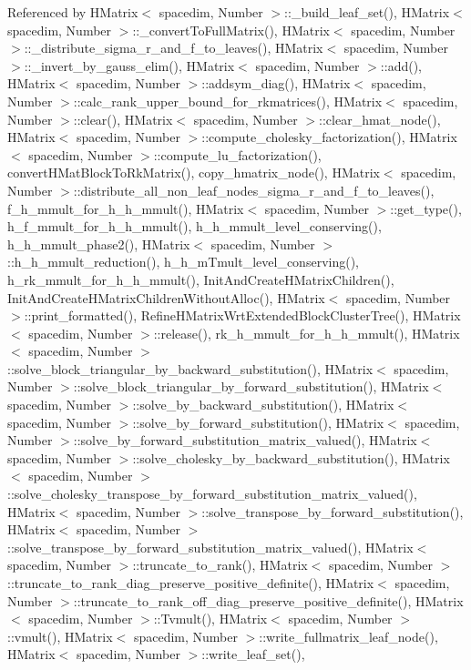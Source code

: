 Referenced by H\+Matrix$<$ spacedim, Number $>$\+::\+\_\+build\+\_\+leaf\+\_\+set(), H\+Matrix$<$ spacedim, Number $>$\+::\+\_\+convert\+To\+Full\+Matrix(), H\+Matrix$<$ spacedim, Number $>$\+::\+\_\+distribute\+\_\+sigma\+\_\+r\+\_\+and\+\_\+f\+\_\+to\+\_\+leaves(), H\+Matrix$<$ spacedim, Number $>$\+::\+\_\+invert\+\_\+by\+\_\+gauss\+\_\+elim(), H\+Matrix$<$ spacedim, Number $>$\+::add(), H\+Matrix$<$ spacedim, Number $>$\+::addsym\+\_\+diag(), H\+Matrix$<$ spacedim, Number $>$\+::calc\+\_\+rank\+\_\+upper\+\_\+bound\+\_\+for\+\_\+rkmatrices(), H\+Matrix$<$ spacedim, Number $>$\+::clear(), H\+Matrix$<$ spacedim, Number $>$\+::clear\+\_\+hmat\+\_\+node(), H\+Matrix$<$ spacedim, Number $>$\+::compute\+\_\+cholesky\+\_\+factorization(), H\+Matrix$<$ spacedim, Number $>$\+::compute\+\_\+lu\+\_\+factorization(), convert\+H\+Mat\+Block\+To\+Rk\+Matrix(), copy\+\_\+hmatrix\+\_\+node(), H\+Matrix$<$ spacedim, Number $>$\+::distribute\+\_\+all\+\_\+non\+\_\+leaf\+\_\+nodes\+\_\+sigma\+\_\+r\+\_\+and\+\_\+f\+\_\+to\+\_\+leaves(), f\+\_\+h\+\_\+mmult\+\_\+for\+\_\+h\+\_\+h\+\_\+mmult(), H\+Matrix$<$ spacedim, Number $>$\+::get\+\_\+type(), h\+\_\+f\+\_\+mmult\+\_\+for\+\_\+h\+\_\+h\+\_\+mmult(), h\+\_\+h\+\_\+mmult\+\_\+level\+\_\+conserving(), h\+\_\+h\+\_\+mmult\+\_\+phase2(), H\+Matrix$<$ spacedim, Number $>$\+::h\+\_\+h\+\_\+mmult\+\_\+reduction(), h\+\_\+h\+\_\+m\+Tmult\+\_\+level\+\_\+conserving(), h\+\_\+rk\+\_\+mmult\+\_\+for\+\_\+h\+\_\+h\+\_\+mmult(), Init\+And\+Create\+H\+Matrix\+Children(), Init\+And\+Create\+H\+Matrix\+Children\+Without\+Alloc(), H\+Matrix$<$ spacedim, Number $>$\+::print\+\_\+formatted(), Refine\+H\+Matrix\+Wrt\+Extended\+Block\+Cluster\+Tree(), H\+Matrix$<$ spacedim, Number $>$\+::release(), rk\+\_\+h\+\_\+mmult\+\_\+for\+\_\+h\+\_\+h\+\_\+mmult(), H\+Matrix$<$ spacedim, Number $>$\+::solve\+\_\+block\+\_\+triangular\+\_\+by\+\_\+backward\+\_\+substitution(), H\+Matrix$<$ spacedim, Number $>$\+::solve\+\_\+block\+\_\+triangular\+\_\+by\+\_\+forward\+\_\+substitution(), H\+Matrix$<$ spacedim, Number $>$\+::solve\+\_\+by\+\_\+backward\+\_\+substitution(), H\+Matrix$<$ spacedim, Number $>$\+::solve\+\_\+by\+\_\+forward\+\_\+substitution(), H\+Matrix$<$ spacedim, Number $>$\+::solve\+\_\+by\+\_\+forward\+\_\+substitution\+\_\+matrix\+\_\+valued(), H\+Matrix$<$ spacedim, Number $>$\+::solve\+\_\+cholesky\+\_\+by\+\_\+backward\+\_\+substitution(), H\+Matrix$<$ spacedim, Number $>$\+::solve\+\_\+cholesky\+\_\+transpose\+\_\+by\+\_\+forward\+\_\+substitution\+\_\+matrix\+\_\+valued(), H\+Matrix$<$ spacedim, Number $>$\+::solve\+\_\+transpose\+\_\+by\+\_\+forward\+\_\+substitution(), H\+Matrix$<$ spacedim, Number $>$\+::solve\+\_\+transpose\+\_\+by\+\_\+forward\+\_\+substitution\+\_\+matrix\+\_\+valued(), H\+Matrix$<$ spacedim, Number $>$\+::truncate\+\_\+to\+\_\+rank(), H\+Matrix$<$ spacedim, Number $>$\+::truncate\+\_\+to\+\_\+rank\+\_\+diag\+\_\+preserve\+\_\+positive\+\_\+definite(), H\+Matrix$<$ spacedim, Number $>$\+::truncate\+\_\+to\+\_\+rank\+\_\+off\+\_\+diag\+\_\+preserve\+\_\+positive\+\_\+definite(), H\+Matrix$<$ spacedim, Number $>$\+::\+Tvmult(), H\+Matrix$<$ spacedim, Number $>$\+::vmult(), H\+Matrix$<$ spacedim, Number $>$\+::write\+\_\+fullmatrix\+\_\+leaf\+\_\+node(), H\+Matrix$<$ spacedim, Number $>$\+::write\+\_\+leaf\+\_\+set(), 